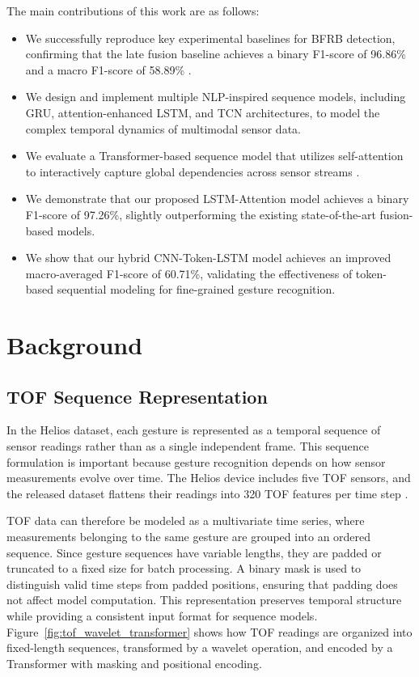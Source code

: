 \documentclass[conference]{IEEEtran}
\begin{document}
The main contributions of this work are as follows:
\begin{itemize}
    \item We successfully reproduce key experimental baselines for BFRB detection, confirming that the late fusion baseline achieves a binary F1-score of 96.86\% and a macro F1-score of 58.89\% \cite{zhang2025baseline}.
    \item We design and implement multiple NLP-inspired sequence models, including GRU, attention-enhanced LSTM, and TCN architectures, to model the complex temporal dynamics of multimodal sensor data.
    \item We evaluate a Transformer-based sequence model that utilizes self-attention to interactively capture global dependencies across sensor streams \cite{vaswani2017attention}.
    \item We demonstrate that our proposed LSTM-Attention model achieves a binary F1-score of 97.26\%, slightly outperforming the existing state-of-the-art fusion-based models.
    \item We show that our hybrid CNN-Token-LSTM model achieves an improved macro-averaged F1-score of 60.71\%, validating the effectiveness of token-based sequential modeling for fine-grained gesture recognition.
\end{itemize}

\clearpage
\section{Background}

\subsection{TOF Sequence Representation}

In the Helios dataset, each gesture is represented as a temporal sequence of sensor readings rather than as a single independent frame. This sequence formulation is important because gesture recognition depends on how sensor measurements evolve over time. The Helios device includes five TOF sensors, and the released dataset flattens their readings into 320 TOF features per time step \cite{zhang2025bfrb}.

TOF data can therefore be modeled as a multivariate time series, where measurements belonging to the same gesture are grouped into an ordered sequence. Since gesture sequences have variable lengths, they are padded or truncated to a fixed size for batch processing. A binary mask is used to distinguish valid time steps from padded positions, ensuring that padding does not affect model computation. This representation preserves temporal structure while providing a consistent input format for sequence models. Figure~\ref{fig:tof_wavelet_transformer} shows how TOF readings are organized into fixed-length sequences, transformed by a wavelet operation, and encoded by a Transformer with masking and positional encoding.
\end{document}
